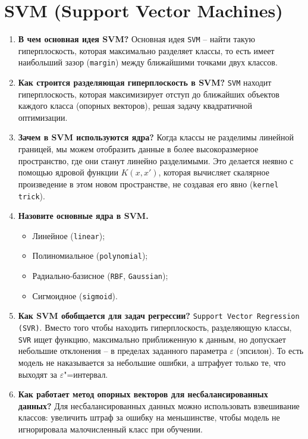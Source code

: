 \documentclass{article}
\begin{document}
\section{SVM (Support Vector Machines)}
\begin{enumerate}
    \item \textbf{В чем основная идея SVM?} Основная идея \texttt{SVM} -- найти такую гиперплоскость, которая максимально разделяет классы, то есть имеет наибольший зазор (\texttt{margin}) между ближайшими точками двух классов.
    \item \textbf{Как строится разделяющая гиперплоскость в SVM?} \texttt{SVM} находит гиперплоскость, которая максимизирует отступ до ближайших объектов каждого класса (опорных векторов), решая задачу квадратичной оптимизации.
    \item \textbf{Зачем в SVM используются ядра?} Когда классы не разделимы линейной границей, мы можем отобразить данные в более высокоразмерное пространство, где они станут линейно разделимыми. Это делается неявно с помощью ядровой функции $K(x,x')$, которая вычисляет скалярное произведение в этом новом пространстве, не создавая его явно (\texttt{kernel trick}).
    \item \textbf{Назовите основные ядра в SVM.}
    \begin{itemize}
        \item Линейное (\texttt{linear});
        \item Полиномиальное (\texttt{polynomial});
        \item Радиально-базисное (\texttt{RBF}, \texttt{Gaussian});
        \item Сигмоидное (\texttt{sigmoid}).
    \end{itemize}
    \item \textbf{Как SVM обобщается для задач регрессии?} \texttt{Support Vector Regression (SVR)}. Вместо того чтобы находить гиперплоскость, разделяющую классы, \texttt{SVR} ищет функцию, максимально приближенную к данным, но допускает небольшие отклонения -- в пределах заданного параметра $\varepsilon$ (эпсилон). То есть модель не наказывается за небольшие ошибки, а штрафует только те, что выходят за $\varepsilon$"=интервал.
    \item \textbf{Как работает метод опорных векторов для несбалансированных данных?} Для несбалансированных данных можно использовать взвешивание классов: увеличить штраф за ошибку на меньшинстве, чтобы модель не игнорировала малочисленный класс при обучении.
\end{enumerate}
\end{document}
